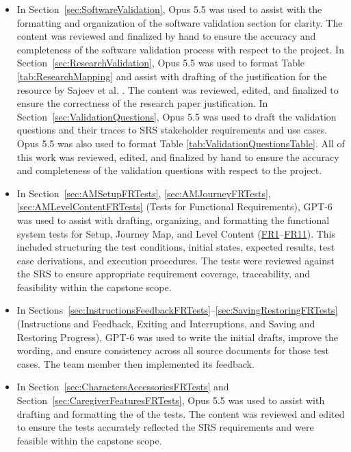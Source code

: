 \documentclass[10pt,titlepage]{article}
\newcommand{\srsurl}{https://team-hindsight.github.io/ophthamology-game/SRS/SRS.pdf}
\newcommand{\srsfrref}[2]{\href{\srsurl\#nameddest=#1}{FR#2}}
\begin{document}
\begin{itemize}
  \item In Section~\ref{sec:SoftwareValidation}, Opus 5.5 was used to assist with the 
  formatting and organization of the software validation section for clarity. The 
  content was reviewed and finalized by hand to ensure the accuracy and completeness of the
  software validation process with respect to the project. In 
  Section~\ref{sec:ResearchValidation}, Opus 5.5 was used to format Table \ref{tab:ResearchMapping} 
  and assist with drafting of the justification for the resource by Sajeev et al. \cite{Sajeev2021Games}. 
  The content was reviewed, edited, and finalized to ensure the correctness of the research 
  paper justification. In Section~\ref{sec:ValidationQuestions}, Opus 5.5 was used to draft 
  the validation questions and their traces to SRS stakeholder requirements and use cases. Opus 
  5.5 was also used to format Table \ref{tab:ValidationQuestionsTable}. All of this work was reviewed, 
  edited, and finalized by hand to ensure the accuracy and completeness of the validation questions 
  with respect to the project.

  \item In Section~\ref{sec:AMSetupFRTests}, \ref{sec:AMJourneyFRTests}, \ref{sec:AMLevelContentFRTests} (Tests for Functional Requirements), GPT-6
  was used to assist with drafting, organizing, and formatting
  the functional system tests for Setup, Journey Map, and
  Level Content (\srsfrref{FR_MedicalNotice}{1}--\srsfrref{FR_LevelEnd}{11}). This included structuring the test
  conditions, initial states, expected results, test case
  derivations, and execution procedures. The tests were reviewed
  against the SRS to ensure appropriate requirement coverage,
  traceability, and feasibility within the capstone scope.

  \item In Sections~\ref{sec:InstructionsFeedbackFRTests}--\ref{sec:SavingRestoringFRTests}
  (Instructions and Feedback, Exiting and Interruptions, and Saving and
  Restoring Progress), GPT-6 was used to write the initial drafts, improve
  the wording, and ensure consistency across all source documents for those
  test cases. The team member then implemented its feedback.

  \item In Section~\ref{sec:CharactersAccessoriesFRTests} and Section~\ref{sec:CaregiverFeaturesFRTests}, 
  Opus 5.5 was used to assist with drafting and formatting the of the tests. The content was reviewed and 
  edited to ensure the tests accurately reflected the SRS requirements and were feasible within the 
  capstone scope. 


\end{itemize}
\end{document}
